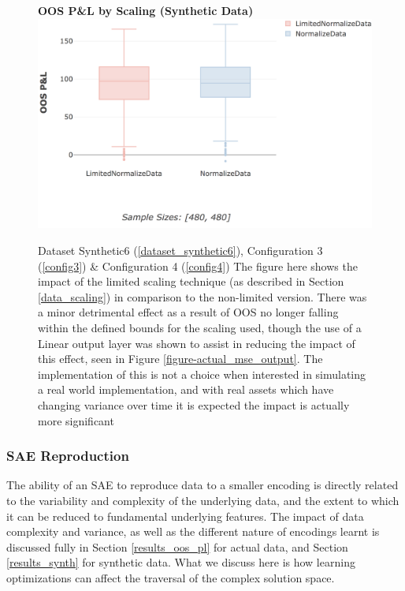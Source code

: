 \documentclass[a4paper,11pt,oneside]{article}
\theoremstyle{plain}
\theoremstyle{definition}
\begin{document}
	\begin{figure}[H]
		\centering
		\textbf{OOS P\&L by Scaling (Synthetic Data)} 
		\includegraphics[scale=0.4]{images/results/8_6_complexity/oos_scaling.png}
		\caption[OOS P\&L by Scaling (Synthetic Data)]{Dataset Synthetic6  (\ref{dataset_synthetic6}), Configuration 3 (\ref{config3}) \& Configuration 4 (\ref{config4})
				\newline The figure here shows the impact of the limited scaling technique (as described in Section \ref{data_scaling}) in comparison to the non-limited version. There was a minor detrimental effect as a result of OOS no longer falling within the defined bounds for the scaling used, though the use of a Linear output layer was shown to assist in reducing the impact of this effect, seen in Figure \ref{figure-actual_mse_output}. The implementation of this is not a choice when interested in simulating a real world implementation, and with real assets which have changing variance over time it is expected the impact is actually more significant }
		\label{figure-synth_pl_scaling}
	\end{figure}


	
	\subsubsection{SAE Reproduction}

	The ability of an SAE to reproduce data to a smaller encoding is directly related to the variability and complexity of the underlying data, and the extent to which it can be reduced to fundamental underlying features. The impact of data complexity and variance, as well as the different nature of encodings learnt is discussed fully in Section \ref{results_oos_pl} for actual data, and Section \ref{results_synth} for synthetic data. What we discuss here is how learning optimizations can affect the traversal of the complex solution space. \newline
	
\end{document}
